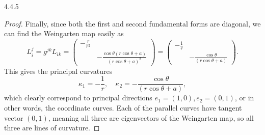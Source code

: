 \documentclass[11pt]{article}
\begin{document}
\begin{problem}{4.4.5}
\begin{proof}
Finally, since both the first and second fundamental forms are diagonal, we can find the Weingarten map easily as
\begin{equation}
\label{eq:23}
L_i^j = g^{jk}L_{ik} = \begin{pmatrix}
- \frac{r}{r^2}  &  \\
                 & - \frac{\cos\theta(r\cos\theta + a)}{(r\cos\theta + a)^2} \end{pmatrix} = \begin{pmatrix}
- \frac{1}{r}  &  \\
               & - \frac{\cos\theta}{(r\cos\theta + a)}
 \end{pmatrix}.
\end{equation}
This gives the principal curvatures
\begin{equation}
\label{eq:24}
\kappa_1 = - \frac{1}{r}, \quad \kappa_2 = - \frac{\cos\theta}{(r\cos\theta + a)},
\end{equation}
which clearly correspond to principal directions \( e_1 = (1,0), e_2 = (0,1) \), or in other words, the coordinate curves.
Each of the parallel curves have tangent vector \( (0,1) \), meaning all three are eigenvectors of the Weingarten map, so all three are lines of curvature.
\end{proof}
\end{problem}
\end{document}
